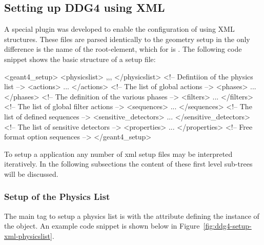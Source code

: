 \documentclass[10pt,a4paper]{article}
\begin{document}
\subsection{Setting up DDG4 using XML}
\label{sec:ddg4-implementation-setup-xml}

\noindent
A special plugin was developed to enable the configuration of \DDG using
XML structures. These files are parsed identically to the geometry setup
in \DDhep the only difference is the name of the root-element, which for 
\DDG is . 
The following code snippet shows the basic structure of a \DDG setup file:
\begin{unnumberedcode}
<geant4_setup>
  <physicslist>          ,,,  </physicslist>  <!-- Defintiion of the physics list          -->
  <actions>              ...  </actions>      <!-- The list of global actions              -->
  <phases>               ...  </phases>       <!-- The definition of the various phases    -->
  <filters>              ...  </filters>      <!-- The list of global filter actions       -->
  <sequences>            ...  </sequences>    <!-- The list of defined sequences           -->
  <sensitive_detectors>  ...  </sensitive_detectors>  <!-- The list of sensitive detectors -->
  <properties>           ...  </properties>   <!-- Free format option sequences            -->
</geant4_setup>
\end{unnumberedcode}
To setup a  application any number of xml setup files may be interpreted 
iteratively. In the following subsections the content of these first level sub-trees will
be discussed.

\subsubsection{Setup of the Physics List}
\label{sec:ddg4-setup-xml-physicslist}

\noindent
The main tag to setup a physics list is  with the 
 attribute defining the instance of the  object.
An example code snippet is shown below in Figure~\ref{fig:ddg4-setup-xml-physicslist}.
\end{document}
